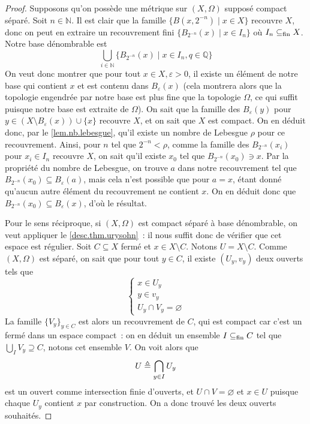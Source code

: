 \begin{proof}
  Supposons qu'on possède une métrique sur $(X,\Omega)$ supposé compact séparé.
  Soit $n\in \mathbb N$. Il est clair que la famille
  $\{B(x,2^{-n})\mid x \in X\}$ recouvre $X$, donc on peut en extraire un
  recouvrement fini $\{B_{2^{-n}}(x)\mid x \in I_n\}$ où $I_n\subseteq_{\mathrm{fin}} X$. Notre
  base dénombrable est
  \[\bigcup_{i\in \mathbb N} \{B_{2^{-n}}(x)\mid x \in I_n, q \in \mathbb Q\}\]
  On veut donc montrer que pour tout $x\in X, \varepsilon > 0$, il existe un
  élément de notre base qui contient $x$ et est contenu dans $B_\varepsilon(x)$
  (cela montrera alors que la topologie engendrée par notre base est plus
  fine que la topologie $\Omega$, ce qui suffit puisque notre base est
  extraite de $\Omega$). On sait que la famille des $B_\varepsilon(y)$ pour
  $y \in (X \setminus B_\varepsilon(x))\cup \{x\}$ recouvre $X$, et on sait que
  $X$ est compact. On en déduit donc, par le \cref{lem.nb.lebesgue}, qu'il
  existe un nombre de Lebesgue $\rho$ pour ce recouvrement. Ainsi, pour $n$ tel
  que $2^{-n} < \rho$, comme la famille des $B_{2^{-n}}(x_i)$ pour $x_i \in I_n$
  recouvre $X$, on sait qu'il existe $x_0$ tel que $B_{2^{-n}}(x_0) \ni x$. Par la
  propriété du nombre de Lebesgue, on trouve $a$ dans notre recouvrement tel que
  $B_{2^{-n}}(x_0)\subseteq B_\varepsilon(a)$, mais cela n'est possible que pour
  $a = x$, étant donné qu'aucun autre élément du recouvrement ne contient $x$.
  On en déduit donc que $B_{2^{-n}}(x_0)\subseteq B_\varepsilon(x)$, d'où le
  résultat.

  Pour le sens réciproque, si $(X,\Omega)$ est compact séparé à base
  dénombrable, on veut appliquer le \cref{desc.thm.urysohn}~: il nous suffit
  donc de vérifier que cet espace est régulier. Soit $C\subseteq X$ fermé et
  $x\in X \setminus C$. Notons $U = X \setminus C$. Comme $(X,\Omega)$ est
  séparé, on sait que pour tout $y \in C$, il existe $(U_y,v_y)$ deux ouverts
  tels que
  \[\left\{\begin{array}{c}
  x \in U_y\\
  y \in v_y\\
  U_y \cap V_y = \varnothing
  \end{array}\right.\]
  La famille $\{V_y\}_{y \in C}$ est alors un recouvrement de $C$, qui est
  compact car c'est un fermé dans un espace compact~: on en déduit un ensemble
  $I\subseteq_{\mathrm{fin}} C$ tel que $\bigcup_I V_y \supseteq C$, notons cet ensemble $V$.
  On voit alors que
  \[U \triangleq \bigcap_{y\in I} U_y\]
  est un ouvert comme intersection finie d'ouverts, et $U\cap V = \varnothing$
  et $x \in U$ puisque chaque $U_y$ contient $x$ par construction. On a donc
  trouvé les deux ouverts souhaités.


\end{proof}
